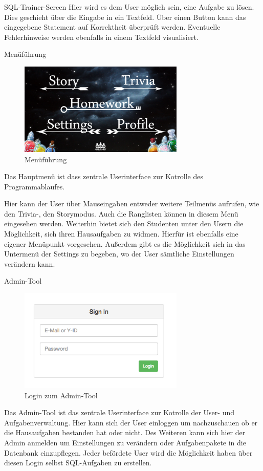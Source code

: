 \begin{ui}{40}{SQL-Trainer-Screen}
Hier wird es dem User möglich sein, eine Aufgabe zu lösen. Dies geschieht über die Eingabe in ein Textfeld. 
Über einen Button kann das eingegebene Statement auf Korrektheit überprüft werden. Eventuelle Fehlerhinweise
werden ebenfalls in einem Textfeld visualisiert.
\end{ui}

\begin{ui}{20}{Menüführung}
\begin{figure}[ht]
\centering
\includegraphics[width=0.7\textwidth]{figures/home_screen.png}
\caption{Men\"uf\"uhrung}
\label{gui}
\end{figure}
Das Hauptmenü ist dass zentrale Userinterface zur Kotrolle des Programmablaufes. 

Hier kann der User über Mauseingaben entweder weitere Teilmenüs 
aufrufen, wie den Trivia-, den Storymodus. Auch die Ranglisten k\"onnen in diesem Men\"u eingesehen werden.
Weiterhin bietet sich den Studenten unter den Usern die Möglichkeit, sich ihren Hausaufgaben zu widmen. Hierf\"ur ist ebenfalls eine eigener Men\"upunkt 
vorgesehen. Au{\ss}erdem gibt es die Möglichkeit sich in das Untermenü der Settings zu begeben, wo der User s\"amtliche Einstellungen ver\"andern kann.
\end{ui}


\begin{ui}{50}{Admin-Tool}
\begin{figure}[ht]
\centering
\includegraphics[width=0.7\textwidth]{figures/sign_in_admintool.png}
\caption{Login zum Admin-Tool}
\label{gui}
\end{figure}
Das Admin-Tool ist das zentrale Userinterface zur Kotrolle der User- und Aufgabenverwaltung. Hier kann sich der User einloggen um nachzuschauen ob er die 
Hausaufgaben bestanden hat oder nicht. Des Weiteren kann sich hier der Admin anmelden um Einstellungen zu ver\"andern oder Aufgabenpakete in die Datenbank 
einzupflegen. Jeder bef\"ordete User wird die M\"oglichkeit haben \"uber diesen Login selbst SQL-Aufgaben zu erstellen.   
\end{ui}



